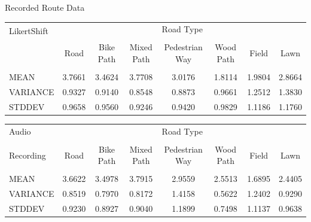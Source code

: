 \documentclass[
    english,
    accentcolor=9c,
    design=2023,
    logofile=images/hulogo.pdf,
]{tudabeamer}
\begin{document}
{    \begin{frame}{Recorded Route Data}
        \begin{table}[!htb]
            \scriptsize
            \centering
            \begin{tabular}{l|ccccccc}
                \multirow{2}{*}{LikertShift} & \multicolumn{7}{c}{Road Type}\\
                \cline{2-8}
                &&&&&&&\\[-1em]
                & Road & Bike Path & Mixed Path & Pedestrian Way & Wood Path & Field & Lawn\\[0.15em]
                \hline
                &&&&&&&\\[-0.8em]
                MEAN     & 3.7661 & 3.4624 & 3.7708 & 3.0176 & 1.8114 & 1.9804 & 2.8664\\[0.3em]
                VARIANCE & 0.9327 & 0.9140 & 0.8548 & 0.8873 & 0.9661 & 1.2512 & 1.3830\\[0.3em]
                STDDEV   & 0.9658 & 0.9560 & 0.9246 & 0.9420 & 0.9829 & 1.1186 & 1.1760\\
            \end{tabular}

            \vspace{1em}
            \begin{tabular}{l|ccccccc}
                \textsf{Audio} & \multicolumn{7}{c}{Road Type}\\
                \cline{2-8}
                &&&&&&&\\[-1em]
                \textsf{Recording} & Road & Bike Path & Mixed Path & Pedestrian Way & Wood Path & Field & Lawn\\[0.15em]
                \hline
                &&&&&&&\\[-0.8em]
                MEAN     & 3.6622 & 3.4978 & 3.7915 & 2.9559 & 2.5513 & 1.6895 & 2.4405\\[0.3em]
                VARIANCE & 0.8519 & 0.7970 & 0.8172 & 1.4158 & 0.5622 & 1.2402 & 0.9290\\[0.3em]
                STDDEV   & 0.9230 & 0.8927 & 0.9040 & 1.1899 & 0.7498 & 1.1137 & 0.9638\\
            \end{tabular}


\end{table}
\end{frame}}
\end{document}
